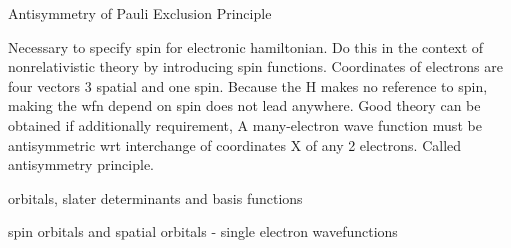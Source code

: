 \documentclass[10pt, draft]{article}
\begin{document}
Antisymmetry of Pauli Exclusion Principle\linebreak[1]

Necessary to specify spin for electronic hamiltonian.  Do this in the context of nonrelativistic theory by introducing spin functions.  Coordinates of electrons are four vectors 3 spatial and one spin.  Because the H makes no reference to spin, making the wfn depend on spin does not lead anywhere. Good theory can be obtained if additionally requirement, A many-electron wave function must be antisymmetric wrt interchange of coordinates X of any 2 electrons.  Called antisymmetry principle. \linebreak[1]

orbitals, slater determinants and basis functions\linebreak[1]

spin orbitals and spatial orbitals - single electron wavefunctions\\
\end{document}
